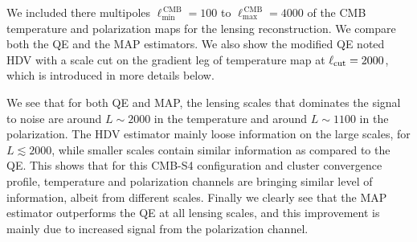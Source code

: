 \documentclass[prd, superscriptaddress, tightenlines, longbibliography, nofootinbib, eqsecnum, amsfonts, amsmath, floatfix, twocolumn, notitlepage]{revtex4-2}
\begin{document}
We included there multipoles $\ell_{\text{min}}^{\, \text{CMB}} = 100$ to $\ell_{\text{max}}^{\, \text{CMB}} = 4000$ of the CMB temperature and polarization maps for the lensing reconstruction. 
We compare both the QE and the MAP estimators. We also show the modified QE noted HDV \cite{Hu:2007bt} with a scale cut on the gradient leg of temperature map at $\ell_{\rm cut}=2000$, which is introduced in more details below.

We see that for both QE and MAP, the lensing scales that dominates the signal to noise are around $L\sim 2000$ in the temperature and around  $L\sim 1100$ in the polarization. The HDV estimator mainly loose information on the large scales, for $L \lesssim 2000$, while smaller scales contain similar information as compared to the QE.
This shows that for this CMB-S4 configuration and cluster convergence profile, temperature and polarization channels are bringing similar level of information, albeit from different scales.  
Finally we clearly see that the MAP estimator outperforms the QE at all lensing scales, and this improvement is mainly due to increased signal from the polarization channel. 
\end{document}
